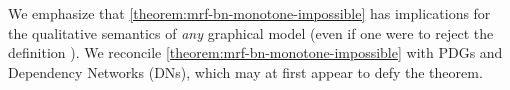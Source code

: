 We emphasize that \cref{theorem:mrf-bn-monotone-impossible} has implications for the qualitative semantics of \emph{any} graphical model (even if one were to reject the definition \scibility). 
%
We reconcile \cref{theorem:mrf-bn-monotone-impossible} with PDGs and Dependency Networks (DNs), which may at first appear to defy the theorem.


